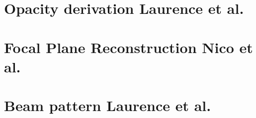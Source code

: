 \documentclass[a4paper, 11pt]{report}
\begin{document}


\clearpage
\chapter{Opacity derivation {\color{YellowGreen} Laurence et al.}}
\label{se:opacities}


\clearpage
\chapter{Focal Plane Reconstruction {\color{blue} Nico et al.}}
\label{se:fp_reconstruction}



\clearpage
\chapter{Beam pattern {\color{blue} Laurence et al.} }
\label{se:beams}

%


\clearpage
%
\end{document}
